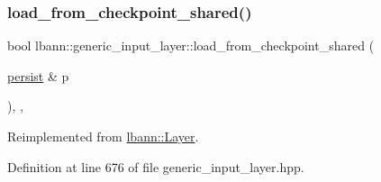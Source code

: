 \subsubsection{\texorpdfstring{load\+\_\+from\+\_\+checkpoint\+\_\+shared()}{load\_from\_checkpoint\_shared()}}
{\footnotesize\ttfamily bool lbann\+::generic\+\_\+input\+\_\+layer\+::load\+\_\+from\+\_\+checkpoint\+\_\+shared (\begin{DoxyParamCaption}\item[{\hyperlink{classlbann_1_1persist}{persist} \&}]{p }\end{DoxyParamCaption})\hspace{0.3cm}{\ttfamily [inline]}, {\ttfamily [override]}, {\ttfamily [virtual]}}



Reimplemented from \hyperlink{classlbann_1_1Layer_a9e262970ecc64166e8b6610e2502ad30}{lbann\+::\+Layer}.



Definition at line 676 of file generic\+\_\+input\+\_\+layer.\+hpp.



